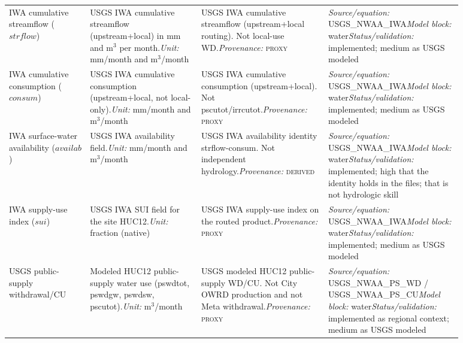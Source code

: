 \documentclass[11pt]{article}
\newcommand{\Derived}{\textsc{derived}}
\newcommand{\Proxy}{\textsc{proxy}}
\begin{document}
\begin{longtable}{@{}p{0.16\linewidth}p{0.22\linewidth}p{0.24\linewidth}p{0.26\linewidth}@{}}
IWA cumulative streamflow ($strflow$) & USGS IWA cumulative streamflow (upstream+local) in mm and m$^{3}$ per month.\newline \textit{Unit:} mm/month and m$^{3}$/month & USGS IWA cumulative streamflow (upstream+local routing). Not local-use WD.\newline \textit{Provenance:} \Proxy{} & \textit{Source/equation:} USGS\_NWAA\_IWA\newline \textit{Model block:} water\newline \textit{Status/validation:} implemented; medium as USGS modeled\\
IWA cumulative consumption ($consum$) & USGS IWA cumulative consumption (upstream+local, not local-only).\newline \textit{Unit:} mm/month and m$^{3}$/month & USGS IWA cumulative consumption (upstream+local). Not pscutot/irrcutot.\newline \textit{Provenance:} \Proxy{} & \textit{Source/equation:} USGS\_NWAA\_IWA\newline \textit{Model block:} water\newline \textit{Status/validation:} implemented; medium as USGS modeled\\
IWA surface-water availability ($availab$) & USGS IWA availability field.\newline \textit{Unit:} mm/month and m$^{3}$/month & USGS IWA availability identity strflow-consum. Not independent hydrology.\newline \textit{Provenance:} \Derived{} & \textit{Source/equation:} USGS\_NWAA\_IWA\newline \textit{Model block:} water\newline \textit{Status/validation:} implemented; high that the identity holds in the files; that is not hydrologic skill\\
IWA supply-use index ($sui$) & USGS IWA SUI field for the site HUC12.\newline \textit{Unit:} fraction (native) & USGS IWA supply-use index on the routed product.\newline \textit{Provenance:} \Proxy{} & \textit{Source/equation:} USGS\_NWAA\_IWA\newline \textit{Model block:} water\newline \textit{Status/validation:} implemented; medium as USGS modeled\\
USGS public-supply withdrawal/CU & Modeled HUC12 public-supply water use (pswdtot, pswdgw, pswdsw, pscutot).\newline \textit{Unit:} m$^{3}$/month & USGS modeled HUC12 public-supply WD/CU. Not City OWRD production and not Meta withdrawal.\newline \textit{Provenance:} \Proxy{} & \textit{Source/equation:} USGS\_NWAA\_PS\_WD / USGS\_NWAA\_PS\_CU\newline \textit{Model block:} water\newline \textit{Status/validation:} implemented as regional context; medium as USGS modeled\\

\end{longtable}
\end{document}
